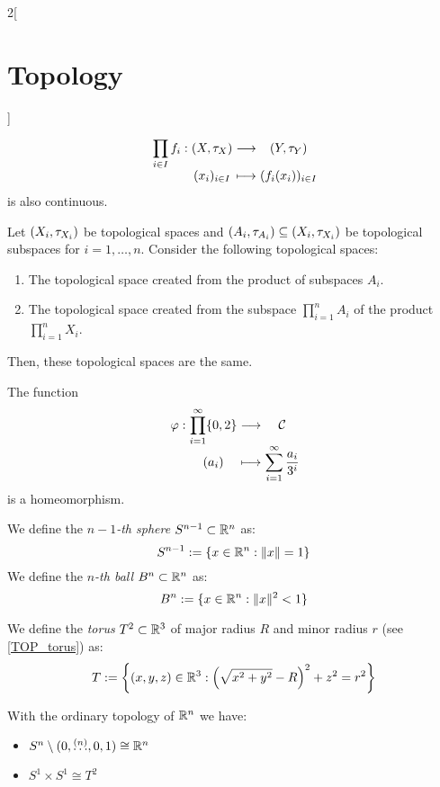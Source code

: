 \documentclass[../../../main.tex]{subfiles}
\begin{document}
\begin{multicols}{2}[\section{Topology}]
\begin{prop}
    $$
      \function{\displaystyle\prod_{i\in I}f_i}{\left(X,\topo_X\right)}{\left(Y,\topo_Y\right)}{(x_i)_{i\in I}}{(f_i(x_i))_{i\in I}}
    $$ is also continuous.
  \end{prop}
  \begin{prop}
    Let $(X_i,\tau_{X_i})$ be topological spaces and $(A_i,\tau_{A_i})\subseteq (X_i,\tau_{X_i})$ be topological subspaces for $i=1,\ldots, n$. Consider the following topological spaces:
    \begin{enumerate}
      \item The topological space created from the product of subspaces $A_i$.
      \item The topological space created from the subspace $\prod_{i=1}^nA_i$ of the product $\prod_{i=1}^nX_i$.
    \end{enumerate}
    Then, these topological spaces are the same.
  \end{prop}
  \begin{theorem}
    The function
    $$
      \function{\varphi}{\displaystyle\prod_{i=1}^\infty\{0,2\}}{\mathcal{C}}{(a_i)}{\displaystyle\sum_{i=1}^\infty\frac{a_i}{3^i}}
    $$
    is a homeomorphism.
  \end{theorem}
  \begin{definition}
    We define the \textit{$n-1$-th sphere} $S^{n-1}\subset \mathbb{R}^n$ as: $$S^{n-1}:=\{x\in\mathbb{R}^n:\|x\|=1\}$$
    We define the \textit{$n$-th ball} $B^n\subset \mathbb{R}^n$ as: $$B^n:=\{x\in\mathbb{R}^n:\|x\|^2<1\}$$
  \end{definition}
  \begin{definition}[Torus]
    We define the \textit{torus} $T^2\subset \mathbb{R}^3$ of major radius $R$ and minor radius $r$ (see \cref{TOP_torus}) as: $$T:=\left\{(x,y,z)\in\mathbb{R}^3:{\left(\sqrt{x^2+y^2}-R\right)}^2+z^2=r^2\right\}$$
  \end{definition}
  \begin{center}
    \begin{minipage}{\linewidth}
      \centering
      
      \label{TOP_torus}
    \end{minipage}
  \end{center}
  \begin{prop}
    With the ordinary topology of $\mathbb{R}^n$ we have:
    \begin{itemize}
      \item $S^n\setminus(0,\overset{(n)}{\ldots},0,1)\cong\mathbb{R}^n$
      \item $S^1\times S^1\cong T^2$
    \end{itemize}
  \end{prop}

\end{multicols}
\end{document}

